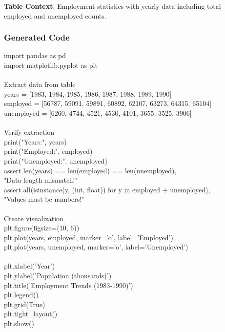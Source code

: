 \textbf{Table Context}: Employment statistics with yearly data including total employed and unemployed counts.

\subsubsection{Generated Code}

import pandas as pd \\
import matplotlib.pyplot as plt \\
\\
 Extract data from table \\
years = [1983, 1984, 1985, 1986, 1987, 1988, 1989, 1990] \\
employed = [56787, 59091, 59891, 60892, 62107, 63273, 64315, 65104] \\
unemployed = [6260, 4744, 4521, 4530, 4101, 3655, 3525, 3906] \\
\\
 Verify extraction \\
print("Years:", years) \\
print("Employed:", employed) \\
print("Unemployed:", unemployed) \\
assert len(years) == len(employed) == len(unemployed), \ \\
      "Data length mismatch!" \\
assert all(isinstance(y, (int, float)) for y in employed + unemployed), \ \\
      "Values must be numbers!" \\
\\
 Create visualization \\
plt.figure(figsize=(10, 6)) \\
plt.plot(years, employed, marker='o', label='Employed') \\
plt.plot(years, unemployed, marker='o', label='Unemployed') \\
\\
plt.xlabel('Year') \\
plt.ylabel('Population (thousands)') \\
plt.title('Employment Trends (1983-1990)') \\
plt.legend() \\
plt.grid(True) \\
plt.tight\_layout() \\
plt.show() \\
\\

